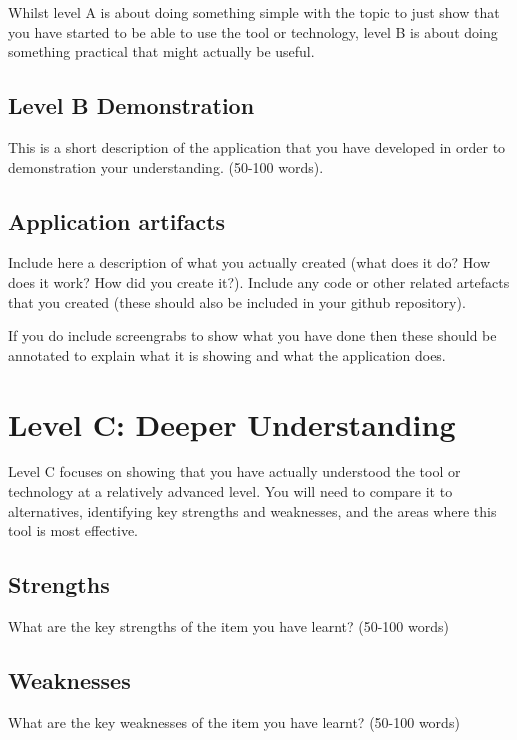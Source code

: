 \documentclass[a4paper, 11pt]{report}
\begin{document}
Whilst level A is about doing something simple with the topic to just show that you have started to be able to use the tool or technology, level B is about doing something practical that might actually be useful.

\subsection{Level B Demonstration}

This is a short description of the application that you have developed in order to demonstration your understanding. (50-100 words).

\subsection{Application artifacts}

Include here a description of what you actually created (what does it do? How does it work? How did you create it?). Include any code or other related artefacts that you created (these should also be included in your github repository).

If you do include screengrabs to show what you have done then these should be annotated to explain what it is showing and what the application does.



\newpage
\section{Level C: Deeper Understanding}

Level C focuses on showing that you have actually understood the tool or technology at a relatively advanced level. You will need to compare it to alternatives, identifying key strengths and weaknesses, and the areas where this tool is most effective. 

\subsection{Strengths}
What are the key strengths of the item you have learnt? (50-100 words)

\subsection{Weaknesses}
What are the key weaknesses of the item you have learnt? (50-100 words)
\end{document}
